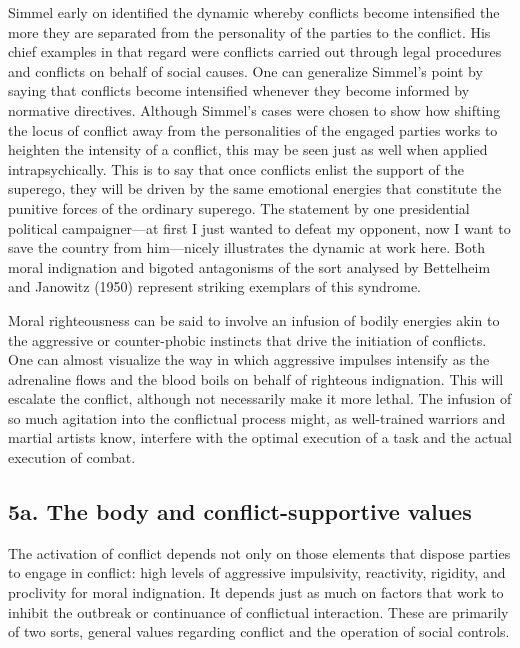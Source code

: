 Simmel early on identified the dynamic whereby conflicts become intensified the more they are separated from the personality of the parties to the conflict. His chief examples in that regard were conflicts carried out through legal procedures and conflicts on behalf of social causes. One can generalize Simmel's point by saying that conflicts become intensified whenever they become informed by normative directives. Although Simmel's cases were chosen to show how shifting the locus of conflict away from the personalities of the engaged parties works to heighten the intensity of a conflict, this may be seen just as well when applied intrapsychically. This is to say that once conflicts enlist the support of the superego, they will be driven by the same emotional energies that constitute the punitive forces of the ordinary superego. The statement by one presidential political campaigner---at first I just wanted to defeat my opponent, now I want to save the country from him---nicely illustrates the dynamic at work here. Both moral indignation and bigoted antagonisms of the sort analysed by Bettelheim and Janowitz (1950) represent striking exemplars of this syndrome.

Moral righteousness can be said to involve an infusion of bodily energies akin to the aggressive or counter-phobic instincts that drive the initiation of conflicts. One can almost visualize the way in which aggressive impulses intensify as the adrenaline flows and the blood boils on behalf of righteous indignation. This will escalate the conflict, although not necessarily make it more lethal. The infusion of so much agitation into the conflictual process might, as well-trained warriors and martial artists know, interfere with the optimal execution of a task and the actual execution of combat.

\subsection*{5a. The body and conflict-supportive values}

The activation of conflict depends not only on those elements that dispose parties to engage in conflict: high levels of aggressive impulsivity, reactivity, rigidity, and proclivity for moral indignation. It depends just as much on factors that work to inhibit the outbreak or continuance of conflictual interaction. These are primarily of two sorts, general values regarding conflict and the operation of social controls.


